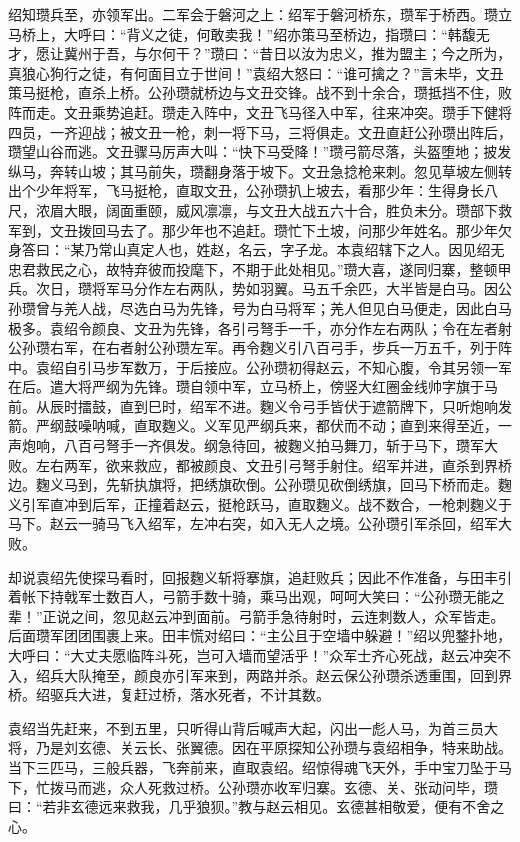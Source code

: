 绍知瓒兵至，亦领军出。二军会于磐河之上：绍军于磐河桥东，瓒军于桥西。瓒立马桥上，大呼曰：“背义之徒，何敢卖我！”绍亦策马至桥边，指瓒曰：“韩馥无才，愿让冀州于吾，与尔何干？”瓒曰：“昔日以汝为忠义，推为盟主；今之所为，真狼心狗行之徒，有何面目立于世间！”袁绍大怒曰：“谁可擒之？”言未毕，文丑策马挺枪，直杀上桥。公孙瓒就桥边与文丑交锋。战不到十余合，瓒抵挡不住，败阵而走。文丑乘势追赶。瓒走入阵中，文丑飞马径入中军，往来冲突。瓒手下健将四员，一齐迎战；被文丑一枪，刺一将下马，三将俱走。文丑直赶公孙瓒出阵后，瓒望山谷而逃。文丑骤马厉声大叫：“快下马受降！”瓒弓箭尽落，头盔堕地；披发纵马，奔转山坡；其马前失，瓒翻身落于坡下。文丑急捻枪来刺。忽见草坡左侧转出个少年将军，飞马挺枪，直取文丑，公孙瓒扒上坡去，看那少年：生得身长八尺，浓眉大眼，阔面重颐，威风凛凛，与文丑大战五六十合，胜负未分。瓒部下救军到，文丑拨回马去了。那少年也不追赶。瓒忙下土坡，问那少年姓名。那少年欠身答曰：“某乃常山真定人也，姓赵，名云，字子龙。本袁绍辖下之人。因见绍无忠君救民之心，故特弃彼而投麾下，不期于此处相见。”瓒大喜，遂同归寨，整顿甲兵。次日，瓒将军马分作左右两队，势如羽翼。马五千余匹，大半皆是白马。因公孙瓒曾与羌人战，尽选白马为先锋，号为白马将军；羌人但见白马便走，因此白马极多。袁绍令颜良、文丑为先锋，各引弓弩手一千，亦分作左右两队；令在左者射公孙瓒右军，在右者射公孙瓒左军。再令麴义引八百弓手，步兵一万五千，列于阵中。袁绍自引马步军数万，于后接应。公孙瓒初得赵云，不知心腹，令其另领一军在后。遣大将严纲为先锋。瓒自领中军，立马桥上，傍竖大红圈金线帅字旗于马前。从辰时擂鼓，直到巳时，绍军不进。麴义令弓手皆伏于遮箭牌下，只听炮响发箭。严纲鼓噪呐喊，直取麴义。义军见严纲兵来，都伏而不动；直到来得至近，一声炮响，八百弓弩手一齐俱发。纲急待回，被麴义拍马舞刀，斩于马下，瓒军大败。左右两军，欲来救应，都被颜良、文丑引弓弩手射住。绍军并进，直杀到界桥边。麴义马到，先斩执旗将，把绣旗砍倒。公孙瓒见砍倒绣旗，回马下桥而走。麴义引军直冲到后军，正撞着赵云，挺枪跃马，直取麴义。战不数合，一枪刺麴义于马下。赵云一骑马飞入绍军，左冲右突，如入无人之境。公孙瓒引军杀回，绍军大败。

却说袁绍先使探马看时，回报麴义斩将搴旗，追赶败兵；因此不作准备，与田丰引着帐下持戟军士数百人，弓箭手数十骑，乘马出观，呵呵大笑曰：“公孙瓒无能之辈！”正说之间，忽见赵云冲到面前。弓箭手急待射时，云连刺数人，众军皆走。后面瓒军团团围裹上来。田丰慌对绍曰：“主公且于空墙中躲避！”绍以兜鍪扑地，大呼曰：“大丈夫愿临阵斗死，岂可入墙而望活乎！”众军士齐心死战，赵云冲突不入，绍兵大队掩至，颜良亦引军来到，两路并杀。赵云保公孙瓒杀透重围，回到界桥。绍驱兵大进，复赶过桥，落水死者，不计其数。

袁绍当先赶来，不到五里，只听得山背后喊声大起，闪出一彪人马，为首三员大将，乃是刘玄德、关云长、张翼德。因在平原探知公孙瓒与袁绍相争，特来助战。当下三匹马，三般兵器，飞奔前来，直取袁绍。绍惊得魂飞天外，手中宝刀坠于马下，忙拨马而逃，众人死救过桥。公孙瓒亦收军归寨。玄德、关、张动问毕，瓒曰：“若非玄德远来救我，几乎狼狈。”教与赵云相见。玄德甚相敬爱，便有不舍之心。

